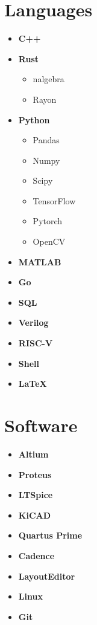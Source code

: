 \documentclass[]{chandan-cv}
\begin{document}
\begin{minipage}[t]{0.21\textwidth}


\section{Languages}
	\begin{itemize}
		\setlength\itemsep{-0.2em}
		\item \textbf{C++}
		\item \textbf{Rust}
				\begin{itemize}
						\setlength\itemsep{-0.17em}
						\item nalgebra
						\item Rayon
				\end{itemize}
		\item \textbf{Python}
			\begin{itemize}
				\setlength\itemsep{-0.17em}
				\item Pandas
				\item Numpy
				\item Scipy
				\item TensorFlow
				\item Pytorch
				\item OpenCV
			\end{itemize}
		\item \textbf{MATLAB}
		\item \textbf{Go}
		\item \textbf{SQL}
		\item \textbf{Verilog}
		\item \textbf{RISC-V}
		\item \textbf{Shell}
		\item \textbf{LaTeX}
	\end{itemize}


\section{Software}
	\begin{itemize}
		\setlength\itemsep{-0.17em}
		\item \textbf{Altium}
		\item \textbf{Proteus}
		\item \textbf{LTSpice}
		\item \textbf{KiCAD}
		\item \textbf{Quartus Prime}
		\item \textbf{Cadence}
		\item \textbf{LayoutEditor}
		\item \textbf{Linux}
		\item \textbf{Git}
	\end{itemize}


\end{minipage}
\end{document}
